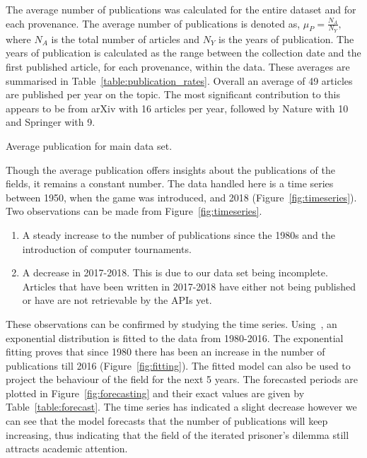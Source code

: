 \documentclass{article}
\theoremstyle{definition}
\begin{document}
The average number of publications was calculated for the entire dataset and for
each provenance. The average number of publications is denoted as,
\(\mu_P = \frac{N_A}{N_Y},\) where \(N_A\) is the total number of articles and
\(N_Y\) is the years of publication. The years of publication is calculated as
the range between the collection date and the first published article, for each provenance,
within the data.
These averages are summarised in Table~\ref{table:publication_rates}.
Overall an average of 49 articles are published per year on the topic. The most
significant contribution to this appears to be from arXiv with 16 articles per year,
followed by Nature with 10 and Springer with 9.

\begin{table}[!hbtp]
    \begin{center}
    
    \end{center}
    \caption{Average publication for main data set.} %
    \label{table:publication_rates}
\end{table}

Though the average publication offers insights about the publications of the
fields, it remains a constant number. The data handled here is a time
series between 1950, when the game was introduced, and 2018 (Figure~\ref{fig:timeseries}). 
Two observations can be made from Figure~\ref{fig:timeseries}.

\begin{enumerate}
    \item A steady increase to the number of publications since the 1980s
    and the introduction of computer tournaments.
    \item A decrease in 2017-2018. This is due to our data set being incomplete.
    Articles that have been written in 2017-2018 have either not being published
    or have are not retrievable by the APIs yet.
\end{enumerate}

These observations can be confirmed by studying the time series.
Using~\cite{scipy}, an exponential distribution is fitted to
the data from 1980-2016. The exponential fitting proves that since 1980 there has
been an increase in the number of publications till 2016 (Figure~\ref{fig:fitting}).
The fitted model can also be used to project the behaviour of the field for the next 
5 years. The forecasted periods are plotted in Figure~\ref{fig:forecasting} and
their exact values are given by Table~\ref{table:forecast}. The time series
has indicated a slight decrease however we can see that the model forecasts that the number
of publications will keep increasing, thus indicating that the field of the iterated
prisoner's dilemma still attracts academic attention.
\end{document}
